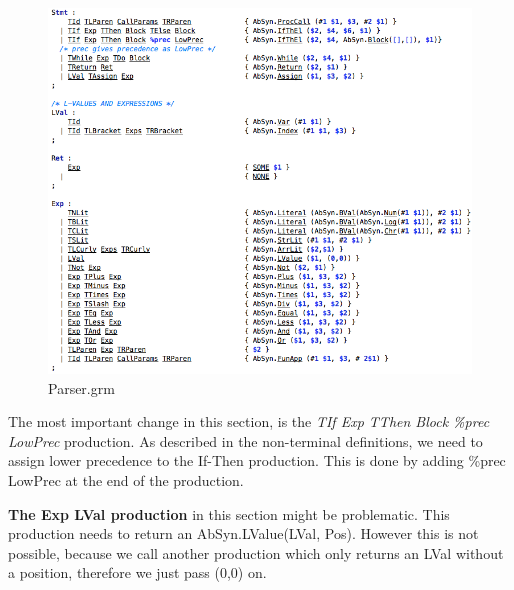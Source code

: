 \documentclass[12pt,a4paper,english]{article}
\begin{document}
\begin{figure}[h]\includegraphics[width=16cm]{statements.png}\caption{Parser.grm}\end{figure}
The most important change in this section, is the \textit{TIf Exp TThen Block \%prec LowPrec} production. As described in the non-terminal definitions, we need to assign lower precedence to the If-Then production. This is done by adding \%prec LowPrec at the end of the production. \

\textbf{The Exp LVal production} in this section might be problematic. This production needs to return an AbSyn.LValue(LVal, Pos). However this is not possible, because we call another production which only returns an LVal without a position, therefore we just pass (0,0) on.
\end{document}
